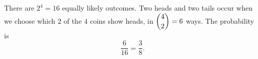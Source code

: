 There are $2^4=16$ equally likely outcomes. Two heads and two tails occur when we choose which $2$ of the $4$ coins show heads, in $\dbinom42=6$ ways. The probability is
\[
\dfrac{6}{16}=\boxed{\dfrac{3}{8}}.
\]
